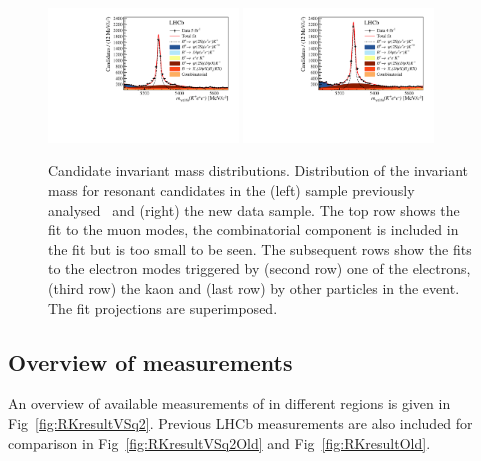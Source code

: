\begin{figure}
    \includegraphics[width=0.45\textwidth]{figures/FigS2g.pdf}
    \includegraphics[width=0.45\textwidth]{figures/FigS2h.pdf}
    
    \caption{Candidate invariant mass distributions. Distribution of the invariant mass \mKllPsiSconst for \BuPsiK resonant candidates in the (left) sample previously analysed~\cite{LHCb-PAPER-2019-009} and (right) the new data sample. The top row shows the fit to the muon modes, the combinatorial component is included in the fit but is too small to be seen. The subsequent rows show the fits to the electron modes triggered by (second row) one of the electrons, (third row) the kaon and (last row) by other particles in the event. The fit projections are superimposed. 
}
    \label{fig:resPsi2Sfits_categories}
\end{figure}

\clearpage





\clearpage

\subsection*{Overview of {\boldmath \RK} measurements}

An overview of available measurements of \RK in different \qsq regions is given in Fig~\ref{fig:RKresultVSq2}. Previous LHCb measurements are also included for comparison in Fig~\ref{fig:RKresultVSq2Old} and Fig~\ref{fig:RKresultOld}.

